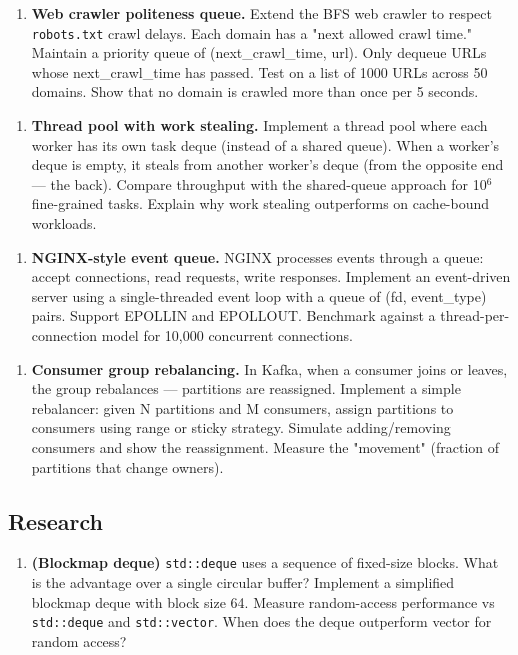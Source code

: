 \begin{enumerate}
\item \textbf{Web crawler politeness queue.} Extend the BFS web crawler to respect \texttt{robots.txt} crawl delays. Each domain has a "next allowed crawl time." Maintain a priority queue of (next\_crawl\_time, url). Only dequeue URLs whose next\_crawl\_time has passed. Test on a list of 1000 URLs across 50 domains. Show that no domain is crawled more than once per 5 seconds.
\end{enumerate}

\begin{enumerate}
\item \textbf{Thread pool with work stealing.} Implement a thread pool where each worker has its own task deque (instead of a shared queue). When a worker's deque is empty, it steals from another worker's deque (from the opposite end — the back). Compare throughput with the shared-queue approach for 10$^{6}$ fine-grained tasks. Explain why work stealing outperforms on cache-bound workloads.
\end{enumerate}

\begin{enumerate}
\item \textbf{NGINX-style event queue.} NGINX processes events through a queue: accept connections, read requests, write responses. Implement an event-driven server using a single-threaded event loop with a queue of (fd, event\_type) pairs. Support EPOLLIN and EPOLLOUT. Benchmark against a thread-per-connection model for 10,000 concurrent connections.
\end{enumerate}

\begin{enumerate}
\item \textbf{Consumer group rebalancing.} In Kafka, when a consumer joins or leaves, the group rebalances — partitions are reassigned. Implement a simple rebalancer: given N partitions and M consumers, assign partitions to consumers using range or sticky strategy. Simulate adding/removing consumers and show the reassignment. Measure the "movement" (fraction of partitions that change owners).
\end{enumerate}

\subsection{Research}

\begin{enumerate}
\item \textbf{(Blockmap deque)} \texttt{std::deque} uses a sequence of fixed-size blocks. What is the advantage over a single circular buffer? Implement a simplified blockmap deque with block size 64. Measure random-access performance vs \texttt{std::deque} and \texttt{std::vector}. When does the deque outperform vector for random access?
\end{enumerate}

